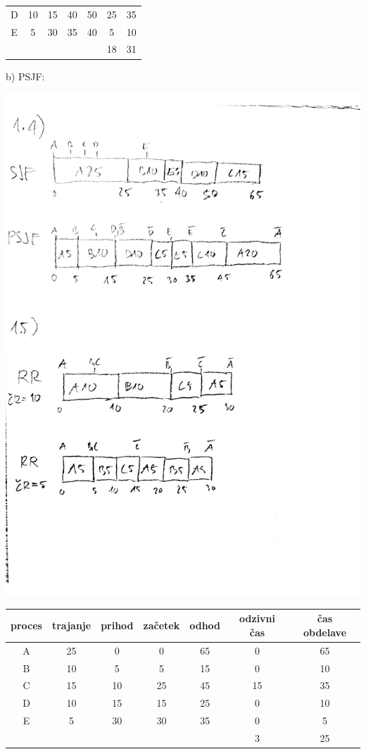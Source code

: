 {\begin{center}
\begin{tabular}{c|cc|cc|cc}
D & 10 & 15 & 40 & 50 & 25 & 35 \\
E &  5 & 30 & 35 & 40 & 5 & 10 \\
\hline
& & & & & 18 & 31
\end{tabular}
\end{center}
b) PSJF:
\begin{center}
\includegraphics[width=.8\textwidth]{razvrscanje/1.4-PSJF.pdf}\\
\begin{tabular}{c|cc|cc|cc}
proces & trajanje & prihod & začetek & odhod & odzivni čas & čas obdelave \\
\hline
A & 25 &  0 &   0 & 65 & 0 & 65 \\
B & 10 &  5 &   5 & 15 &  0 & 10 \\
C & 15 & 10 & 25 & 45 & 15 & 35 \\
D & 10 & 15 & 15 & 25 & 0 & 10 \\
E &  5 & 30 & 30 & 35 & 0 & 5 \\
\hline
& & & & & 3 & 25
\end{tabular}
\end{center}
}


